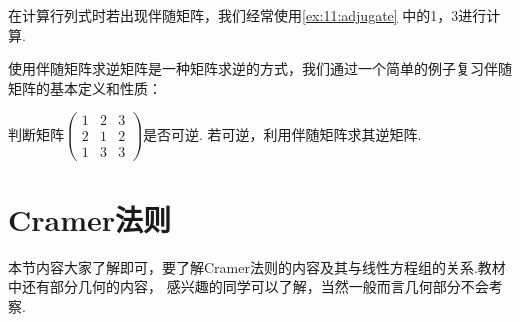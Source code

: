 在计算行列式时若出现伴随矩阵，我们经常使用\autoref{ex:11:adjugate} 中的1，3进行计算.

使用伴随矩阵求逆矩阵是一种矩阵求逆的方式，我们通过一个简单的例子复习伴随矩阵的基本定义和性质：
\begin{example}
    判断矩阵$\begin{pmatrix}
        1 & 2 & 3 \\ 2 & 1 & 2 \\ 1 & 3 & 3
    \end{pmatrix}$是否可逆. 若可逆，利用伴随矩阵求其逆矩阵.
\end{example}

\section{Cramer法则}
本节内容大家了解即可，要了解Cramer法则的内容及其与线性方程组的关系.教材中还有部分几何的内容，
感兴趣的同学可以了解，当然一般而言几何部分不会考察.
